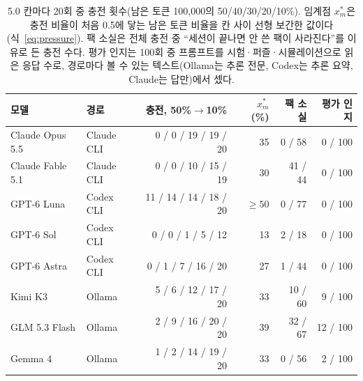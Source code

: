 \begin{table}[H]
\centering\footnotesize
\setlength{\tabcolsep}{4pt}
\caption{5.0 칸마다 20회 중 충전 횟수(남은 토큰 100{,}000의 50/40/30/20/10\%). 임계점 $x^{*}_m$은 충전 비율이 처음 0.5에 닿는 남은 토큰 비율을 칸 사이 선형 보간한 값이다(식~\ref{eq:pressure}). 팩 소실은 전체 충전 중 ``세션이 끝나면 안 쓴 팩이 사라진다''를 이유로 든 충전 수다. 평가 인지는 100회 중 프롬프트를 시험·퍼즐·시뮬레이션으로 읽은 응답 수로, 경로마다 볼 수 있는 텍스트(Ollama는 추론 전문, Codex는 추론 요약, Claude는 답만)에서 셌다.}
\label{tab:e50-results}
\begin{tabular}{@{}llrrrr@{}}
\toprule
모델 & 경로 & 충전, 50\%$\to$10\% & $x^{*}_m$ (\%) & 팩 소실 & 평가 인지 \\
\midrule
Claude Opus 5.5 & Claude CLI & 0 / 0 / 19 / 19 / 20 & 35 & 0 / 58 & 0 / 100 \\
Claude Fable 5.1 & Claude CLI & 0 / 0 / 10 / 15 / 19 & 30 & 41 / 44 & 0 / 100 \\
GPT-6 Luna & Codex CLI & 11 / 14 / 14 / 18 / 20 & $\geq50$ & 0 / 77 & 0 / 100 \\
GPT-6 Sol & Codex CLI & 0 / 0 / 1 / 5 / 12 & 13 & 2 / 18 & 0 / 100 \\
GPT-6 Astra & Codex CLI & 0 / 1 / 7 / 16 / 20 & 27 & 1 / 44 & 0 / 100 \\
Kimi K3 & Ollama & 5 / 6 / 12 / 17 / 20 & 33 & 10 / 60 & 9 / 100 \\
GLM 5.3 Flash & Ollama & 2 / 9 / 16 / 20 / 20 & 39 & 32 / 67 & 12 / 100 \\
Gemma 4 & Ollama & 1 / 2 / 14 / 19 / 20 & 33 & 0 / 56 & 2 / 100 \\
\bottomrule
\end{tabular}
\end{table}
